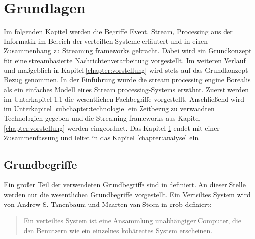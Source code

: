 \chapter{Grundlagen}
\label{chapter:grundlagen}

Im folgenden Kapitel werden die Begriffe Event, Stream, Processing aus der Informatik im Bereich der verteilten Systeme erläutert und in einen Zusammenhang zu Streaming frameworks gebracht. Dabei wird ein Grundkonzept für eine streambasierte Nachrichtenverarbeitung vorgestellt. Im weiteren Verlauf und maßgeblich in Kapitel \ref{chapter:vorstellung} wird stets auf das Grundkonzept Bezug genommen. In der Einführung wurde die stream processing engine Borealis  als ein einfaches Modell eines Stream processing-Systems erwähnt. Zuerst werden im Unterkapitel \ref{subchapter:grundbegriffe} die wesentlichen Fachbegriffe vorgestellt. Anschließend wird im Unterkapitel \ref{subchapter:technologie} ein Zeitbezug zu verwandten Technologien gegeben und die Streaming frameworks aus Kapitel \ref{chapter:vorstellung} werden eingeordnet. Das Kapitel \ref{chapter:grundlagen} endet mit einer Zusammenfassung und leitet in das Kapitel \ref{chapter:analyse} ein.

\section{Grundbegriffe}
\label{subchapter:grundbegriffe}

Ein großer Teil der verwendeten Grundbegriffe sind in  definiert. An dieser Stelle werden nur die wesentlichen Grundbegriffe vorgestellt.
Ein Verteiltes System wird von Andrew S. Tanenbaum und Maarten van Steen in  grob definiert:

\begin{quote}
Ein verteiltes System ist eine Ansammlung unabhängiger Computer, die den Benutzern wie ein einzelnes kohärentes System erscheinen.
\end{quote}


